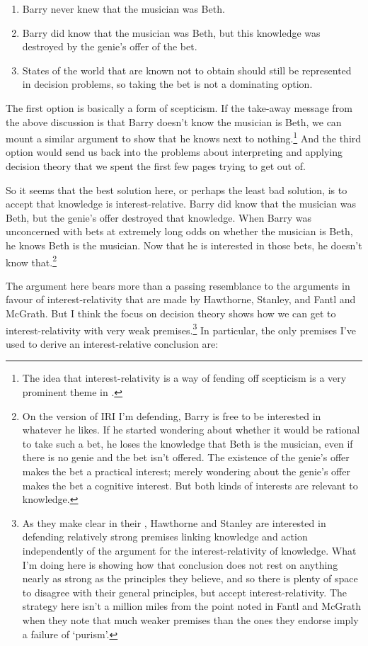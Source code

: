 \begin{enumerate}
\item Barry never knew that the musician was Beth.
\item Barry did know that the musician was Beth, but this knowledge was destroyed by the genie's offer of the bet.
\item States of the world that are known not to obtain should still be represented in decision problems, so taking the bet is not a dominating option.
\end{enumerate}

\noindent The first option is basically a form of scepticism. If the take-away message from the above discussion is that Barry doesn't know the musician is Beth, we can mount a similar argument to show that he knows next to nothing.\footnote{The idea that interest-relativity is a way of fending off scepticism is a very prominent theme in \citet{FantlMcGrath2009}.} And the third option would send us back into the problems about interpreting and applying decision theory that we spent the first few pages trying to get out of.

So it seems that the best solution here, or perhaps the least bad solution, is to accept that knowledge is interest-relative. Barry did know that the musician was Beth, but the genie's offer destroyed that knowledge. When Barry was unconcerned with bets at extremely long odds on whether the musician is Beth, he knows Beth is the musician. Now that he is interested in those bets, he doesn't know that.\footnote{On the version of IRI I'm defending, Barry is free to be interested in whatever he likes. If he started wondering about whether it would be rational to take such a bet, he loses the knowledge that Beth is the musician, even if there is no genie and the bet isn't offered. The existence of the genie's offer makes the bet a practical interest; merely wondering about the genie's offer makes the bet a cognitive interest. But both kinds of interests are relevant to knowledge.}

The argument here bears more than a passing resemblance to the arguments in favour of interest-relativity that are made by Hawthorne, Stanley, and Fantl and McGrath. But I think the focus on decision theory shows how we can get to interest-relativity with very weak premises.\footnote{As they make clear in their \citeyearpar{Hawthorne2008-HAWKAA}, Hawthorne and Stanley are interested in defending relatively strong premises linking knowledge and action independently of the argument for the interest-relativity of knowledge. What I'm doing here is showing how that conclusion does not rest on anything nearly as strong as the principles they believe, and so there is plenty of space to disagree with their general principles, but accept interest-relativity. The strategy here isn't a million miles from the point noted in Fantl and McGrath \citeyearpar[72n14]{FantlMcGrath2009} when they note that much weaker premises than the ones they endorse imply a failure of `purism'.} In particular, the only premises I've used to derive an interest-relative conclusion are:


